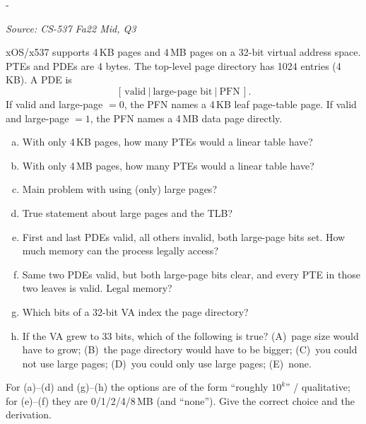 \documentclass[11pt,a4paper]{article}
\makeatletter
\newcommand{\keepspace}[1]{\par\penalty-100\begingroup
  \setlength{\dimen@}{#1}\dimen@ii\pagegoal\advance\dimen@ii-\pagetotal
  \ifdim\dimen@>\dimen@ii\ifdim\dimen@ii>\z@\vfil\fi\break\fi\endgroup}
\newcounter{qn}[section]
\newenvironment{Qn}[4]{%
  \refstepcounter{qn}\keepspace{7\baselineskip}%
  \begin{tcolorbox}[qboxstyle, title={Q\thesection.\theqn\ \ [#1 \textbar\ #2]\ \ #4}]%
  {\footnotesize\color{g3}\textit{Source: #3}}\par\smallskip%
}{%
  \end{tcolorbox}%
}
\makeatother
\begin{document}
\begin{Qn}{Medium-Hard}{Lect 13--14}{CS-537 Fa22 Mid, Q3}{Large pages, TLB reach, and a PDE large-page bit}
xOS/x537 supports 4\,KB pages and 4\,MB pages on a 32-bit virtual
address space. PTEs and PDEs are 4 bytes. The top-level page directory
has 1024 entries (4\,KB). A PDE is
\[
[\,\textrm{valid}\ \vert\ \textrm{large-page bit}\ \vert\ \textrm{PFN}\,].
\]
If valid and large-page $=0$, the PFN names a 4\,KB leaf page-table
page. If valid and large-page $=1$, the PFN names a 4\,MB data page
directly.
\begin{enumerate}[(a)]
\item With only 4\,KB pages, how many PTEs would a linear table have?
\item With only 4\,MB pages, how many PTEs would a linear table have?
\item Main problem with using (only) large pages?
\item True statement about large pages and the TLB?
\item First and last PDEs valid, all others invalid, both large-page
      bits set. How much memory can the process legally access?
\item Same two PDEs valid, but both large-page bits clear, and every
      PTE in those two leaves is valid. Legal memory?
\item Which bits of a 32-bit VA index the page directory?
\item If the VA grew to 33 bits, which of the following is true?
      (A)~page size would have to grow; (B)~the page directory would
      have to be bigger; (C)~you could not use large pages;
      (D)~you could only use large pages; (E)~none.
\end{enumerate}
For (a)--(d) and (g)--(h) the options are of the form ``roughly
$10^k$'' / qualitative; for (e)--(f) they are 0/1/2/4/8\,MB (and
``none''). Give the correct choice and the derivation.
\end{Qn}
\end{document}

